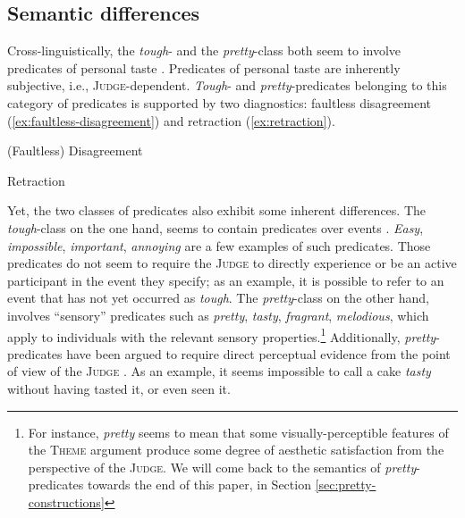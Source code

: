 \documentclass[11pt]{article}
\begin{document}
\subsection{Semantic differences}
Cross-linguistically, the \textit{tough}- and the \textit{pretty}-class both seem to involve predicates of personal taste \cite{Lasnik1974, Pesetsky1987, Lasersohn2005, Gluckman2019, Bylinina2014}. Predicates of personal taste are inherently subjective, i.e., \textsc{Judge}-dependent. \textit{Tough}- and \textit{pretty}-predicates belonging to this category of predicates is supported by two diagnostics: faultless disagreement (\ref{ex:faultless-disagreement}) and retraction (\ref{ex:retraction}).
\begin{exe}
	\ex (Faultless) Disagreement \cite{Lasersohn2005}
	\begin{xlist}
	\end{xlist}\label{ex:faultless-disagreement}
	\ex Retraction \cite{MacFarlane2014}
	\begin{xlist}
	\end{xlist}\label{ex:retraction}
\end{exe}

Yet, the two classes of predicates also exhibit some inherent differences. The \textit{tough}-class on the one hand, seems to contain predicates over events \cite{Gluckman2019}. \textit{Easy}, \textit{impossible}, \textit{important}, \textit{annoying} are a few examples of such predicates. Those predicates do not seem to require the \textsc{Judge} to directly experience or be an active participant in the event they specify; as an example, it is possible to refer to an event that has not yet occurred as \textit{tough}. The \textit{pretty}-class on the other hand, involves ``sensory'' predicates such  as \textit{pretty}, \textit{tasty}, \textit{fragrant}, \textit{melodious}, which apply to individuals with the relevant sensory properties.\footnote{For instance, \textit{pretty} seems to mean that some visually-perceptible features of the \textsc{Theme} argument produce some degree of aesthetic satisfaction from the perspective of the \textsc{Judge}. We will come back to the semantics of \textit{pretty}-predicates towards the end of this paper, in Section \ref{sec:pretty-constructions}} Additionally, \textit{pretty}-predicates have been argued to require direct perceptual evidence from the point of view of the \textsc{Judge} \cite{Pearson2012, Hirvonen2016}. As an example, it seems impossible to call a cake \textit{tasty} without having tasted it, or even seen it.\\
	 
\end{document}
